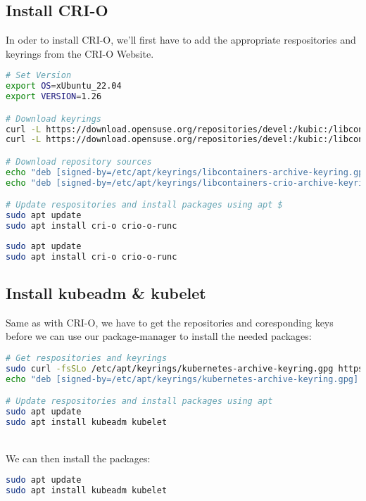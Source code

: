 \subsection{Install CRI-O}

In oder to install CRI-O, we'll first have to add the appropriate respositories and keyrings from the CRI-O Website.

\begin{lstlisting}[language=bash,caption=Add CRI-O repositories]
# Set Version
export OS=xUbuntu_22.04
export VERSION=1.26

# Download keyrings
curl -L https://download.opensuse.org/repositories/devel:/kubic:/libcontainers:/stable/$OS/Release.key | sudo gpg --dearmor -o /etc/apt/keyrings/libcontainers-archive-keyring.gpg
curl -L https://download.opensuse.org/repositories/devel:/kubic:/libcontainers:/stable:/cri-o:/$VERSION/$OS/Release.key | sudo gpg --dearmor -o /etc/apt/keyrings/libcontainers-crio-archive-keyring.gpg

# Download repository sources
echo "deb [signed-by=/etc/apt/keyrings/libcontainers-archive-keyring.gpg] https://download.opensuse.org/repositories/devel:/kubic:/libcontainers:/stable/$OS/ /" | sudo tee /etc/apt/sources.list.d/devel:kubic:libcontainers:stable.list
echo "deb [signed-by=/etc/apt/keyrings/libcontainers-crio-archive-keyring.gpg] https://download.opensuse.org/repositories/devel:/kubic:/libcontainers:/stable:/cri-o:/$VERSION/$OS/ /" | sudo tee /etc/apt/sources.list.d/devel:kubic:libcontainers:stable:cri-o:$VERSION.list

# Update respositories and install packages using apt $
sudo apt update
sudo apt install cri-o crio-o-runc 
\end{lstlisting}

\begin{lstlisting}[language=bash] 
sudo apt update
sudo apt install cri-o crio-o-runc 
\end{lstlisting}

\subsection{Install kubeadm & kubelet}
Same as with CRI-O, we have to get the repositories and coresponding keys before we can use our package-manager to install the needed packages:

\begin{lstlisting}[language=bash] 
# Get respositories and keyrings
sudo curl -fsSLo /etc/apt/keyrings/kubernetes-archive-keyring.gpg https://packages.cloud.google.com/apt/doc/apt-key.gpg
echo "deb [signed-by=/etc/apt/keyrings/kubernetes-archive-keyring.gpg] https://apt.kubernetes.io/ kubernetes-xenial main" | sudo tee /etc/apt/sources.list.d/kubernetes.list

# Update respositories and install packages using apt
sudo apt update
sudo apt install kubeadm kubelet
\end{lstlisting}
\\
We can then install the packages:
\begin{lstlisting}[language=bash] 
sudo apt update
sudo apt install kubeadm kubelet
\end{lstlisting}

